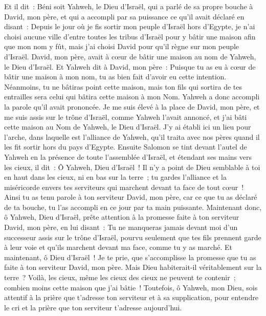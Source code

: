 \begin{multicols}{2}
Et il dit~: Béni soit Yahweh, le Dieu d'Israël, qui a parlé de sa propre bouche à David, mon père, et qui a accompli par sa puissance ce qu'il avait déclaré en disant~:
Depuis le jour où je fis sortir mon peuple d'Israël hors d'Egypte, je n'ai choisi aucune ville d'entre toutes les tribus d'Israël pour y bâtir une maison afin que mon nom y fût, mais j'ai choisi David pour qu'il règne sur mon peuple d'Israël.
David, mon père, avait à cœur de bâtir une maison au nom de Yahweh, le Dieu d'Israël.
Et Yahweh dit à David, mon père~: Puisque tu as eu à cœur de bâtir une maison à mon nom, tu as bien fait d'avoir eu cette intention.
Néanmoins, tu ne bâtiras point cette maison, mais ton fils qui sortira de tes entrailles sera celui qui bâtira cette maison à mon Nom.
Yahweh a donc accompli la parole qu'il avait prononcée. Je me suis élevé à la place de David, mon père, et me suis assis sur le trône d'Israël, comme Yahweh l'avait annoncé, et j'ai bâti cette maison au Nom de Yahweh, le Dieu d'Israël.
J'y ai établi ici un lieu pour l'arche, dans laquelle est l'alliance de Yahweh, qu'il traita avec nos pères quand il les fit sortir hors du pays d'Egypte.
Ensuite Salomon se tint devant l'autel de Yahweh en la présence de toute l'assemblée d'Israël, et étendant ses mains vers les cieux,
il dit~: Ô Yahweh, Dieu d'Israël~! Il n'y a point de Dieu semblable à toi en haut dans les cieux, ni en bas sur la terre~; tu gardes l'alliance et la miséricorde envers tes serviteurs qui marchent devant ta face de tout cœur~!
Ainsi tu as tenu parole à ton serviteur David, mon père, car ce que tu as déclaré de ta bouche, tu l'as accompli en ce jour par ta main puissante.
Maintenant donc, ô Yahweh, Dieu d'Israël, prête attention à la promesse faite à ton serviteur David, mon père, en lui disant~: Tu ne manqueras jamais devant moi d'un successeur assis sur le trône d'Israël, pourvu seulement que tes fils prennent garde à leur voie et qu'ils marchent devant ma face, comme tu y as marché.
Et maintenant, ô Dieu d'Israël~! Je te prie, que s'accomplisse la promesse que tu as faite à ton serviteur David, mon père.
Mais Dieu habiterait-il véritablement sur la terre~? Voilà, les cieux, même les cieux des cieux ne peuvent te contenir~; combien moins cette maison que j'ai bâtie~!
Toutefois, ô Yahweh, mon Dieu, sois attentif à la prière que t'adresse ton serviteur et à sa supplication, pour entendre le cri et la prière que ton serviteur t'adresse aujourd'hui.

\end{multicols}
